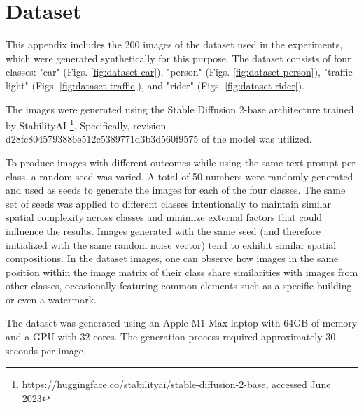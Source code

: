 \chapter{Dataset}
\label{chap:appendix-text-dataset}
 
This appendix includes the 200 images of the dataset used in the experiments, which were generated synthetically for this purpose. The dataset consists of four classes: "car" (Figs. \ref{fig:dataset-car}), "person" (Figs. \ref{fig:dataset-person}), "traffic light" (Figs. \ref{fig:dataset-traffic}), and "rider" (Figs. \ref{fig:dataset-rider}).

The images were generated using the Stable Diffusion 2-base architecture trained by StabilityAI \footnote{\href{https://huggingface.co/stabilityai/stable-diffusion-2-base}{https://huggingface.co/stabilityai/stable-diffusion-2-base}, accessed June 2023}. Specifically, revision d28fc8045793886e512c5389771d3b3d560f9575 of the model was utilized.

To produce images with different outcomes while using the same text prompt per class, a random seed was varied. A total of 50 numbers were randomly generated and used as seeds to generate the images for each of the four classes. The same set of seeds was applied to different classes intentionally to maintain similar spatial complexity across classes and minimize external factors that could influence the results. Images generated with the same seed (and therefore initialized with the same random noise vector) tend to exhibit similar spatial compositions. In the dataset images, one can observe how images in the same position within the image matrix of their class share similarities with images from other classes, occasionally featuring common elements such as a specific building or even a watermark.

The dataset was generated using an Apple M1 Max laptop with 64GB of memory and a GPU with 32 cores. The generation process required approximately 30 seconds per image.

